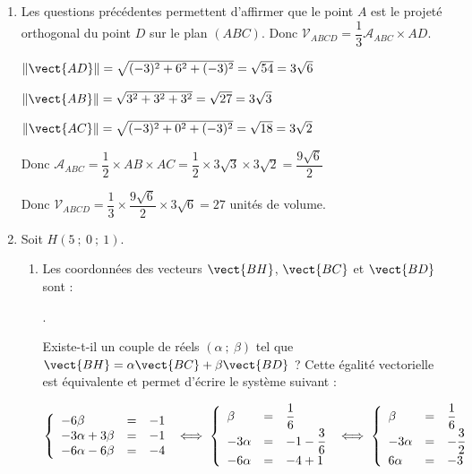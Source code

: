 \begin{enumerate}
Donc le vecteur $\vect{AD}$ est orthogonal aux vecteurs $\vect{AB}$ et $\vect{AC}$, donc il est aussi orthogonal à toute combinaison linéaire des vecteurs $\vect{AB}$ et $\vect{AC}$, donc orthogonal à tout vecteur du plan $(ABC)$.
	\item Les questions précédentes permettent d'affirmer que le point $A$ est le projeté orthogonal du point $D$ sur le plan $(ABC)$. Donc $\mathcal{V}_{ABCD} = \dfrac13 \mathcal{A}_{ABC} \times AD$.
	
$\lVert\vect{AD}\rVert=\sqrt{(-3)^2+6^2+(-3)^2}=\sqrt{54}=3\sqrt{6}$

$\lVert\vect{AB}\rVert=\sqrt{3^2+3^2+3^2}=\sqrt{27}=3\sqrt{3}$

$\lVert\vect{AC}\rVert=\sqrt{(-3)^2+0^2+(-3)^2}=\sqrt{18}=3\sqrt{2}$
	
	Donc $\mathcal{A}_{ABC}=\dfrac{1}{2}\times AB\times AC=\dfrac{1}{2} \times 3\sqrt{3} \times 3\sqrt{2}=\dfrac{9\sqrt{6}}{2}$
	
	Donc $\mathcal{V}_{ABCD}=\dfrac13 \times \dfrac{9\sqrt{6}}{2} \times 3\sqrt{6}= 27 $ unités de volume.
\item Soit $H(5~;~0~;~1)$.
	\begin{enumerate}
		\item Les coordonnées des vecteurs $\vect{BH}$, $\vect{BC}$ et $\vect{BD}$ sont :

 \quad {} \quad {}.

Existe-t-il un couple de réels $(\alpha~;~\beta)$ tel que $\vect{BH}=\alpha\vect{BC}+\beta\vect{BD}$ ? Cette égalité vectorielle est équivalente et permet d'écrire le système suivant :

$\left\{\begin{array}{l c l} -6\beta&=&-1\\-3\alpha+3\beta &=& -1\\-6\alpha-6\beta&=&-4	\end{array}\right. \iff 
\left\{\begin{array}{l c l} \beta&=&\dfrac16\\-3\alpha &=& -1-\dfrac36\\-6\alpha&=&-4+1	\end{array}\right. \iff
 \left\{\begin{array}{l c l} \beta&=&\dfrac16\\-3\alpha &=& -\dfrac32\\6\alpha&=&-3	\end{array}\right.$
		 

\end{enumerate}
\end{enumerate}
